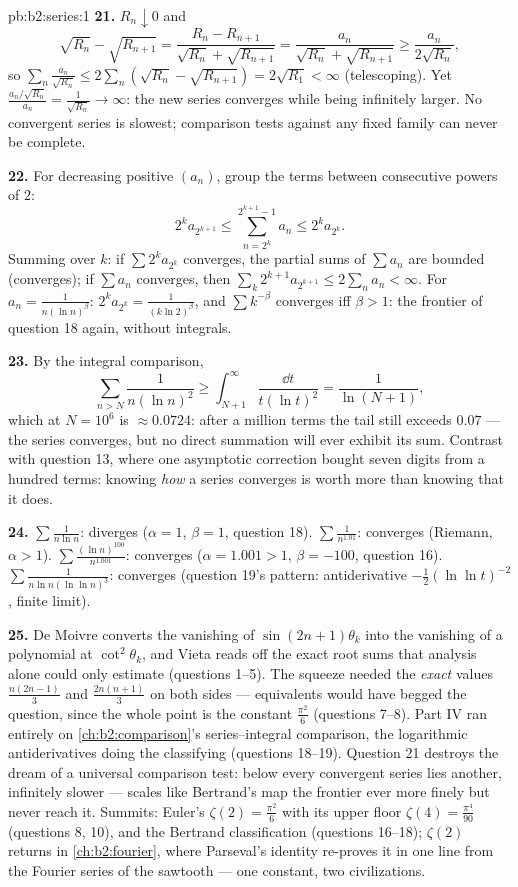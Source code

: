 \begin{solution}{pb:b2:series:1}
\textbf{21.} $R_n \downarrow 0$ and
\[
\sqrt{R_n} - \sqrt{R_{n+1}} = \frac{R_n -
R_{n+1}}{\sqrt{R_n} + \sqrt{R_{n+1}}} =
\frac{a_n}{\sqrt{R_n} + \sqrt{R_{n+1}}} \geq
\frac{a_n}{2\sqrt{R_n}},
\]
so $\sum_n \frac{a_n}{\sqrt{R_n}} \leq 2\sum_n(\sqrt{R_n} -
\sqrt{R_{n+1}}) = 2\sqrt{R_1} < \infty$ (telescoping). Yet
$\frac{a_n/\sqrt{R_n}}{a_n} = \frac1{\sqrt{R_n}} \to \infty$:
the new series converges while being infinitely larger. No
convergent series is slowest; comparison tests against any
fixed family can never be complete.

\textbf{22.} For decreasing positive $(a_n)$, group the terms
between consecutive powers of $2$:
\[
2^{k}a_{2^{k+1}} \leq \sum_{n=2^k}^{2^{k+1}-1} a_n \leq
2^ka_{2^k} .
\]
Summing over $k$: if $\sum 2^ka_{2^k}$ converges, the partial
sums of $\sum a_n$ are bounded (converges); if $\sum a_n$
converges, then $\sum_k 2^{k+1}a_{2^{k+1}} \leq 2\sum_n a_n <
\infty$. For $a_n = \frac1{n(\ln n)^\beta}$: $2^ka_{2^k} =
\frac{1}{(k\ln 2)^\beta}$, and $\sum k^{-\beta}$ converges iff
$\beta > 1$: the frontier of question 18 again, without
integrals.

\textbf{23.} By the integral comparison,
\[
\sum_{n > N}\frac{1}{n(\ln n)^2} \geq
\int_{N+1}^{\infty}\frac{\dd t}{t(\ln t)^2} =
\frac{1}{\ln(N+1)},
\]
which at $N = 10^6$ is $\approx 0.0724$: after a million terms
the tail still exceeds $0.07$ --- the series converges, but no
direct summation will ever exhibit its sum. Contrast with
question 13, where one asymptotic correction bought seven
digits from a hundred terms: knowing \emph{how} a series
converges is worth more than knowing that it does.

\textbf{24.} $\sum\frac1{n\ln n}$: diverges ($\alpha = 1$,
$\beta = 1$, question 18). $\sum\frac1{n^{1.01}}$: converges
(Riemann, $\alpha > 1$). $\sum\frac{(\ln n)^{100}}{n^{1.001}}$:
converges ($\alpha = 1.001 > 1$, $\beta = -100$, question 16).
$\sum\frac1{n\ln n(\ln\ln n)^3}$: converges (question 19's
pattern: antiderivative $-\frac12(\ln\ln t)^{-2}$, finite
limit).

\textbf{25.} De Moivre converts the vanishing of $\sin(2n{+}1)
\theta_k$ into the vanishing of a polynomial at
$\cot^2\theta_k$, and Vieta reads off the exact root sums that
analysis alone could only estimate (questions 1--5). The
squeeze needed the \emph{exact} values $\frac{n(2n-1)}3$ and
$\frac{2n(n+1)}3$ on both sides --- equivalents would have
begged the question, since the whole point is the constant
$\frac{\pi^2}6$ (questions 7--8). Part IV ran entirely on
\cref{ch:b2:comparison}'s series--integral comparison, the
logarithmic antiderivatives doing the classifying (questions
18--19). Question 21 destroys the dream of a universal
comparison test: below every convergent series lies another,
infinitely slower --- scales like Bertrand's map the frontier
ever more finely but never reach it. Summits: Euler's $\zeta(2)
= \frac{\pi^2}6$ with its upper floor $\zeta(4) =
\frac{\pi^4}{90}$ (questions 8, 10), and the Bertrand
classification (questions 16--18); $\zeta(2)$ returns in
\cref{ch:b2:fourier}, where Parseval's identity re-proves it
in one line from the Fourier series of the sawtooth --- one
constant, two civilizations.
\end{solution}
